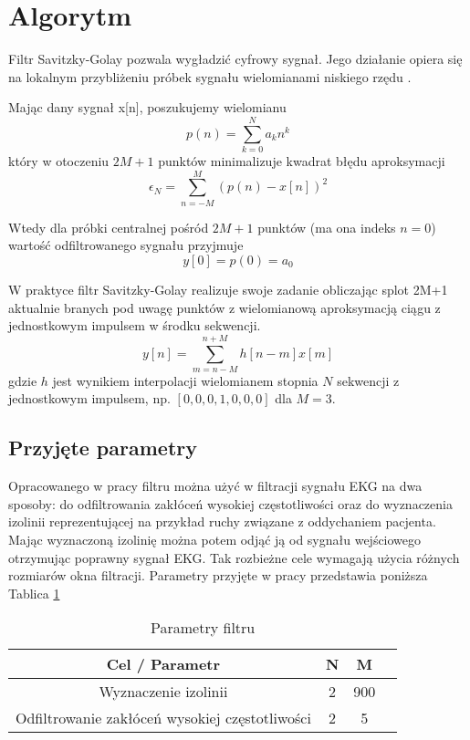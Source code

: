 \section{Algorytm}

Filtr Savitzky-Golay pozwala wygładzić cyfrowy sygnał. Jego działanie opiera się na lokalnym przybliżeniu próbek sygnału wielomianami niskiego rzędu \cite{whatissg}.

Mając dany sygnał x[n], poszukujemy wielomianu
\begin{equation}
p(n) = \sum\limits_{k=0}^N a_k n^k
\end{equation}
który w otoczeniu $2M+1$ punktów minimalizuje kwadrat błędu aproksymacji
\begin{equation}
\epsilon_N = \sum\limits_{n=-M}^M (p(n) - x[n])^2
\end{equation}

Wtedy dla próbki centralnej pośród $2M+1$ punktów (ma ona indeks $n=0$) wartość odfiltrowanego sygnału przyjmuje
\begin{equation}
y[0] = p(0) = a_0
\end{equation}

W praktyce filtr Savitzky-Golay realizuje swoje zadanie obliczając splot 2M+1 aktualnie branych pod uwagę punktów z wielomianową aproksymacją ciągu z jednostkowym impulsem w środku sekwencji.
\begin{equation}
y[n] = \sum\limits_{m=n-M}^{n+M} h[n-m] x[m]
\end{equation}
gdzie $h$ jest wynikiem interpolacji wielomianem stopnia $N$ sekwencji z jednostkowym impulsem, np. $[0, 0, 0, 1, 0, 0, 0]$ dla $M=3$.


\subsection{Przyjęte parametry}
Opracowanego w pracy filtru można użyć w filtracji sygnału EKG na dwa sposoby: do odfiltrowania zakłóceń wysokiej częstotliwości oraz do wyznaczenia izolinii reprezentującej na przykład ruchy związane z oddychaniem pacjenta. Mając wyznaczoną izolinię można potem odjąć ją od sygnału wejściowego otrzymując poprawny sygnał EKG. Tak rozbieżne cele wymagają użycia różnych rozmiarów okna filtracji. Parametry przyjęte w pracy przedstawia poniższa Tablica \ref{tab:params}

\begin{table}[!htb]
  \centering
  \begin{tabular}{|c|c|c|c|}
  \hline 
  Cel / Parametr  & N & M \\  
  \hline 
  Wyznaczenie izolinii & 2 & 900 \\
  \hline
  Odfiltrowanie zakłóceń wysokiej częstotliwości & 2 & 5 \\
  \hline
\end{tabular} 
\caption{Parametry filtru}
\label{tab:params}
\end{table}

